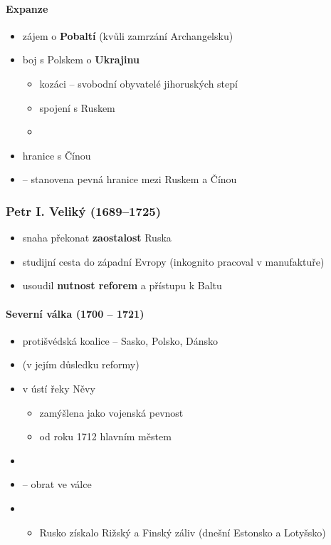 \paragraph{Expanze}
\begin{itemize}
\item zájem o \textbf{Pobaltí} (kvůli zamrzání Archangelsku)
\item boj s Polskem o \textbf{Ukrajinu}
	\begin{itemize}
	\item kozáci -- svobodní obyvatelé jihoruských stepí
	\item {} \ra spojení s Ruskem
	\item {}
	\end{itemize}
\item {} \ra hranice s Čínou
\item {} -- stanovena pevná hranice mezi Ruskem a Čínou
\end{itemize}

\subsubsection{Petr I. Veliký (1689--1725)}
\begin{itemize}
\item snaha překonat \textbf{zaostalost} Ruska
\item studijní cesta do západní Evropy (inkognito pracoval v manufaktuře)
\item usoudil \textbf{nutnost reforem} a přístupu k Baltu
\end{itemize}

\paragraph{Severní válka (1700 -- 1721)}
\begin{itemize}
\item protišvédská koalice -- Sasko, Polsko, Dánsko
\item {} (v jejím důsledku reformy)
\item {} v ústí řeky Něvy
	\begin{itemize}
	\item zamýšlena jako vojenská pevnost
	\item od roku 1712 hlavním městem
	\end{itemize}
\item {}
\item {} -- obrat ve válce
\item {}
	\begin{itemize}
	\item Rusko získalo Rižský a Finský záliv (dnešní Estonsko a Lotyšsko)
	\end{itemize}
\end{itemize}

